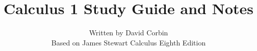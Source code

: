 \documentclass{article}
\begin{document}
\title{Calculus 1 Study Guide and Notes}
\date{}
\author{Written by David Corbin\\ \small{Based on James Stewart Calculus Eighth Edition}}
\maketitle





































\end{document}
